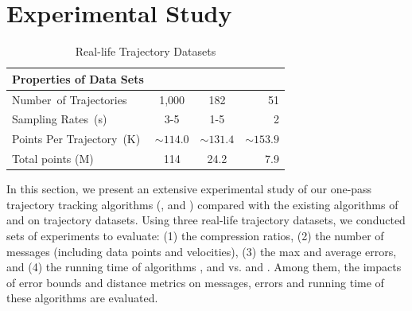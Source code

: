 \section{Experimental Study}
\label{sec-exp}


\begin{table}[tb!]
	\renewcommand{\arraystretch}{1.20}
	\caption{\small Real-life Trajectory Datasets}
	\vspace{-1.5ex}
	\centering
	\footnotesize
	\begin{tabular}{|l|c|c|r|}
		\hline
		\bf{ Properties of Data Sets} & \sercar      &\geolife   &\mopsi \\
		\hline
		{Number\ of Trajectories}	&1,000	    &182	    & 51  \\
		\hline
		 {Sampling Rates\ (s)} &3-5  & 1-5 & 2 \\
		\hline
		{Points Per Trajectory\ (K)}  &	$\sim114.0$    &$\sim131.4$	    & $\sim153.9$ \\
		\hline
		 {Total points (M)} &114   	    	&24.2    &7.9\\
		\hline
	\end{tabular}
	\label{tab:datasets}
	\vspace{-2ex}
\end{table}


In this section, we present an extensive experimental study of our one-pass trajectory tracking algorithms (\citt, \sitt and \bitt) compared with the
existing algorithms of \ldrh and \grts on trajectory datasets. Using three real-life trajectory datasets, we conducted sets of experiments to evaluate:
(1) the compression ratios,
(2) the number of messages (including data points and velocities),
(3) the max and average errors, and
(4) the running time of algorithms \citt, \sitt and \bitt vs. \ldrh and \grts. 
Among them, the impacts of error bounds and distance metrics on messages, errors and running time of these algorithms are evaluated. 




